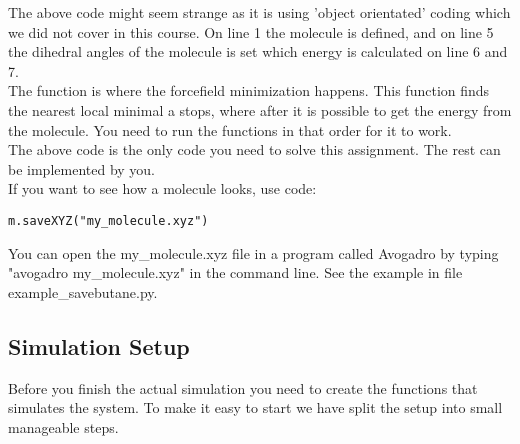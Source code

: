 \documentclass{article}
\begin{document}
The above code might seem strange as it is using 'object orientated'
coding which we did not cover in this course.
On line 1 the molecule  is defined,
and on line 5 the dihedral angles of the molecule is set
which energy is calculated on line 6 and 7.\\

The function  is where the
forcefield minimization happens. This function finds
the nearest local minimal a stops, where after
it is possible to get the energy from the molecule.
You need to run the functions in that order for it to work.\\

The above code is the only code you need to solve this
assignment.
The rest can be implemented by you.\\

If you want to see how a molecule looks, use code:
\begin{lstlisting}
m.saveXYZ("my_molecule.xyz")
\end{lstlisting}
You can open the my\_molecule.xyz file in a program called Avogadro by
typing "avogadro my\_molecule.xyz" in the command line. See the example
in file example\_savebutane.py.

\newpage

\subsection{Simulation Setup}

Before you finish the actual simulation you need to create
the functions that simulates the system.
To make it easy to start we have split the setup into
small manageable steps.
\end{document}
